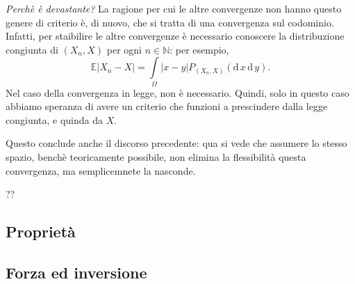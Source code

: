 \emph{Perchè è devastante?} La ragione per cui le altre convergenze non hanno questo genere di criterio è, di nuovo, che si tratta di una convergenza sul codominio. 
Infatti, per staibilire le altre convergenze è necessario conoscere la distribuzione congiunta di $(X_n,X)$ per ogni $n\in\mathbb{N}$: per esempio,
\[
	\mathbb{E}\left|X_n - X\right|=\int\limits_\Omega |x-y| P_{(X_n,X)}(\mathrm{d}\,x \, \mathrm{d}\,y).
\]
Nel caso della convergenza in legge, non è necessario. Quindi, solo in questo caso abbiamo speranza di avere un criterio che funzioni a prescindere dalla legge congiunta, e quinda da $X$.

Questo conclude anche il discorso precedente: qua si vede che assumere lo stesso spazio, benchè teoricamente possibile, non elimina la flessibilità questa convergenza, ma semplicemnete la nasconde.

?? %

\subsection{Proprietà}

\subsection{Forza ed inversione}